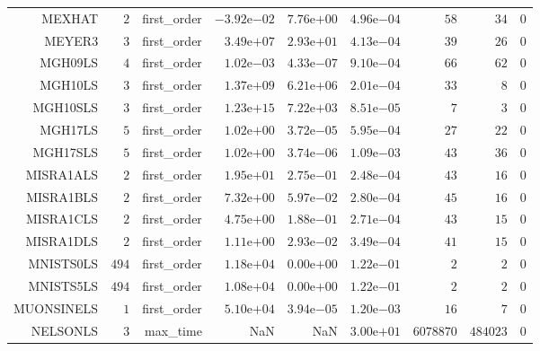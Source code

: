 \begin{longtable}{rrrrrrrrr}
MEXHAT & \(     2\) & first\_order & \(-3.92\)e\(-02\) & \( 7.76\)e\(+00\) & \( 4.96\)e\(-04\) & \(    58\) & \(    34\) & \(     0\) \\
MEYER3 & \(     3\) & first\_order & \( 3.49\)e\(+07\) & \( 2.93\)e\(+01\) & \( 4.13\)e\(-04\) & \(    39\) & \(    26\) & \(     0\) \\
MGH09LS & \(     4\) & first\_order & \( 1.02\)e\(-03\) & \( 4.33\)e\(-07\) & \( 9.10\)e\(-04\) & \(    66\) & \(    62\) & \(     0\) \\
MGH10LS & \(     3\) & first\_order & \( 1.37\)e\(+09\) & \( 6.21\)e\(+06\) & \( 2.01\)e\(-04\) & \(    33\) & \(     8\) & \(     0\) \\
MGH10SLS & \(     3\) & first\_order & \( 1.23\)e\(+15\) & \( 7.22\)e\(+03\) & \( 8.51\)e\(-05\) & \(     7\) & \(     3\) & \(     0\) \\
MGH17LS & \(     5\) & first\_order & \( 1.02\)e\(+00\) & \( 3.72\)e\(-05\) & \( 5.95\)e\(-04\) & \(    27\) & \(    22\) & \(     0\) \\
MGH17SLS & \(     5\) & first\_order & \( 1.02\)e\(+00\) & \( 3.74\)e\(-06\) & \( 1.09\)e\(-03\) & \(    43\) & \(    36\) & \(     0\) \\
MISRA1ALS & \(     2\) & first\_order & \( 1.95\)e\(+01\) & \( 2.75\)e\(-01\) & \( 2.48\)e\(-04\) & \(    43\) & \(    16\) & \(     0\) \\
MISRA1BLS & \(     2\) & first\_order & \( 7.32\)e\(+00\) & \( 5.97\)e\(-02\) & \( 2.80\)e\(-04\) & \(    45\) & \(    16\) & \(     0\) \\
MISRA1CLS & \(     2\) & first\_order & \( 4.75\)e\(+00\) & \( 1.88\)e\(-01\) & \( 2.71\)e\(-04\) & \(    43\) & \(    15\) & \(     0\) \\
MISRA1DLS & \(     2\) & first\_order & \( 1.11\)e\(+00\) & \( 2.93\)e\(-02\) & \( 3.49\)e\(-04\) & \(    41\) & \(    15\) & \(     0\) \\
MNISTS0LS & \(   494\) & first\_order & \( 1.18\)e\(+04\) & \( 0.00\)e\(+00\) & \( 1.22\)e\(-01\) & \(     2\) & \(     2\) & \(     0\) \\
MNISTS5LS & \(   494\) & first\_order & \( 1.08\)e\(+04\) & \( 0.00\)e\(+00\) & \( 1.22\)e\(-01\) & \(     2\) & \(     2\) & \(     0\) \\
MUONSINELS & \(     1\) & first\_order & \( 5.10\)e\(+04\) & \( 3.94\)e\(-05\) & \( 1.20\)e\(-03\) & \(    16\) & \(     7\) & \(     0\) \\
NELSONLS & \(     3\) & max\_time &       NaN &       NaN & \( 3.00\)e\(+01\) & \(6078870\) & \(484023\) & \(     0\) \\

\end{longtable}
